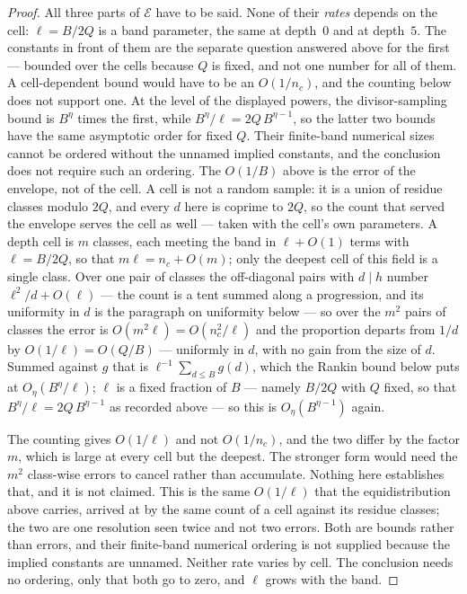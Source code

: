 \documentclass[11pt,a4paper]{article}
\theoremstyle{plain}
\theoremstyle{definition}
\theoremstyle{remark}
\begin{document}
\begin{proof}
All three parts of $\mathcal E$ have to be said. None of their
\emph{rates} depends on the cell: $\ell=B/2Q$ is a band parameter, the
same at depth~$0$ and at depth~$5$. The constants in front of them are
the separate question answered above for the first --- bounded over the
cells because $Q$ is fixed, and not one number for all of them. A cell-dependent bound would have to be an $O(1/n_c)$,
and the counting below does not support one.
At the level of the displayed powers, the divisor-sampling bound is
$B^{\eta}$ times the first, while
$B^{\eta}/\ell=2Q\,B^{\eta-1}$, so the latter two bounds have the
same asymptotic order for fixed $Q$. Their finite-band numerical sizes
cannot be ordered without the unnamed implied constants, and the
conclusion does not require such an ordering. The $O(1/B)$ above is the error of the
envelope, not of the cell. A cell is not a random sample: it is a
union of residue classes modulo $2Q$, and every $d$ here is coprime to
$2Q$, so the count that served the envelope serves the cell as well ---
taken with the cell's own parameters. A depth cell is $m$ classes, each
meeting the band in $\ell+O(1)$ terms with $\ell=B/2Q$, so that
$m\ell=n_c+O(m)$; only the
deepest cell of this field is a single class. Over one pair of classes
the off-diagonal pairs with $d\mid h$ number $\ell^2/d+O(\ell)$ --- the count is a
tent summed along a progression, and its uniformity in $d$ is the
paragraph on uniformity below --- so over the $m^2$
pairs of classes the error is $O(m^2\ell)=O(n_c^2/\ell)$ and the
proportion departs from $1/d$ by $O(1/\ell)=O(Q/B)$ --- uniformly in
$d$, with no gain from the size of $d$. Summed against $g$ that is
$\ell^{-1}\sum_{d\le B}g(d)$, which the Rankin bound below puts at
$O_\eta(B^{\eta}/\ell)$; $\ell$ is a fixed fraction of $B$ --- namely
$B/2Q$ with $Q$ fixed, so that $B^{\eta}/\ell=2Q\,B^{\eta-1}$ as
recorded above --- so this is $O_\eta(B^{\eta-1})$ again.

The counting gives $O(1/\ell)$ and not $O(1/n_c)$, and the two differ
by the factor $m$, which is large at every cell but the deepest. The
stronger form would need the $m^2$ class-wise errors to cancel rather
than accumulate. Nothing here establishes that, and it is not claimed. This is the
same $O(1/\ell)$ that the equidistribution above carries, arrived at by
the same count of a cell against its residue classes; the two are one
resolution seen twice and not two errors. Both are bounds rather than errors, and their finite-band numerical
ordering is not supplied because the implied constants are unnamed.
Neither rate varies by cell. The conclusion needs no ordering, only that
both go to zero, and $\ell$ grows with the band.


\end{proof}
\end{document}
